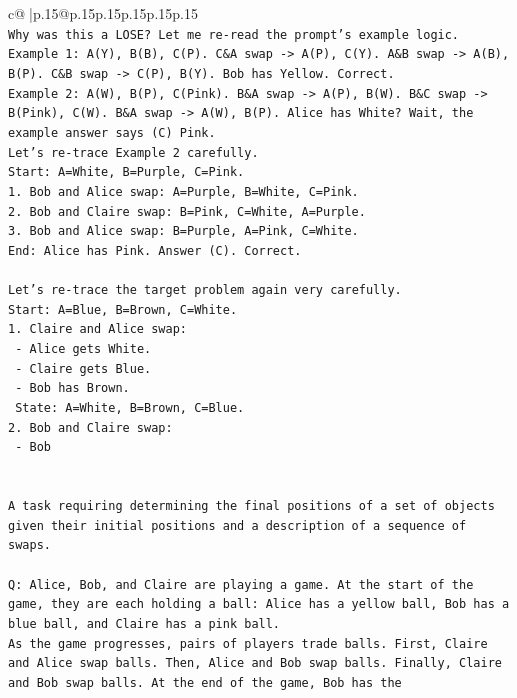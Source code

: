 \documentclass{article}
\begin{document}
{\begin{supertabular}{c@{$\;$}|p{.15\linewidth}@{}p{.15\linewidth}p{.15\linewidth}p{.15\linewidth}p{.15\linewidth}p{.15\linewidth}}
{{{\\ 
\texttt{Why was this a LOSE? Let me re{-}read the prompt's example logic.} \\
\texttt{Example 1: A(Y), B(B), C(P). C\&A swap {-}> A(P), C(Y). A\&B swap {-}> A(B), B(P). C\&B swap {-}> C(P), B(Y). Bob has Yellow. Correct.} \\
\texttt{Example 2: A(W), B(P), C(Pink). B\&A swap {-}> A(P), B(W). B\&C swap {-}> B(Pink), C(W). B\&A swap {-}> A(W), B(P). Alice has White? Wait, the example answer says (C) Pink.} \\
\texttt{Let's re{-}trace Example 2 carefully.} \\
\texttt{Start: A=White, B=Purple, C=Pink.} \\
\texttt{1. Bob and Alice swap: A=Purple, B=White, C=Pink.} \\
\texttt{2. Bob and Claire swap: B=Pink, C=White, A=Purple.} \\
\texttt{3. Bob and Alice swap: B=Purple, A=Pink, C=White.} \\
\texttt{End: Alice has Pink. Answer (C). Correct.} \\
\\ 
\texttt{Let's re{-}trace the target problem again very carefully.} \\
\texttt{Start: A=Blue, B=Brown, C=White.} \\
\texttt{1. Claire and Alice swap:} \\
\texttt{   {-} Alice gets White.} \\
\texttt{   {-} Claire gets Blue.} \\
\texttt{   {-} Bob has Brown.} \\
\texttt{   State: A=White, B=Brown, C=Blue.} \\
\texttt{2. Bob and Claire swap:} \\
\texttt{   {-} Bob} \\
\\ 
\\ 
\texttt{A task requiring determining the final positions of a set of objects given their initial positions and a description of a sequence of swaps.} \\
\\ 
\texttt{Q: Alice, Bob, and Claire are playing a game. At the start of the game, they are each holding a ball: Alice has a yellow ball, Bob has a blue ball, and Claire has a pink ball.} \\
\texttt{As the game progresses, pairs of players trade balls. First, Claire and Alice swap balls. Then, Alice and Bob swap balls. Finally, Claire and Bob swap balls. At the end of the game, Bob has the} \\
}}}
\end{supertabular}}
\end{document}
